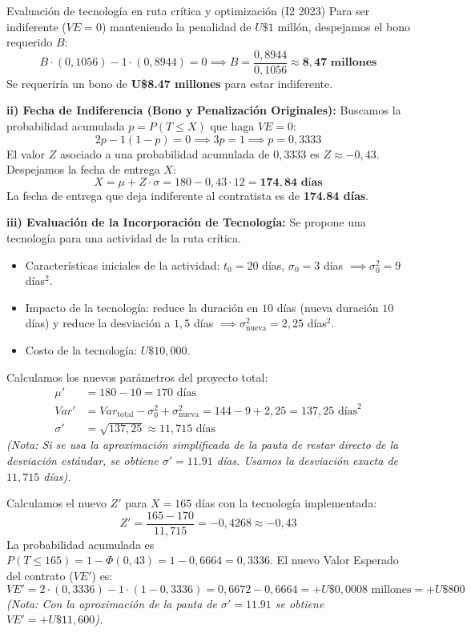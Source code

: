 \begin{ejercicio}{Evaluación de tecnología en ruta crítica y optimización (I2 2023)}
Para ser indiferente ($VE = 0$) manteniendo la penalidad de $U\$1$ millón, despejamos el bono requerido $B$:
\[
  B \cdot (0{,}1056) - 1 \cdot (0{,}8944) = 0 \implies B = \frac{0{,}8944}{0{,}1056} \approx \mathbf{8{,}47\text{ millones}}
\]
Se requeriría un bono de \textbf{U\$8.47 millones} para estar indiferente.

\textbf{ii) Fecha de Indiferencia (Bono y Penalización Originales):}
Buscamos la probabilidad acumulada $p = P(T \le X)$ que haga $VE = 0$:
\[
  2p - 1(1 - p) = 0 \implies 3p = 1 \implies p = 0{,}3333
\]
El valor $Z$ asociado a una probabilidad acumulada de $0{,}3333$ es $Z \approx -0{,}43$. Despejamos la fecha de entrega $X$:
\[
  X = \mu + Z \cdot \sigma = 180 - 0{,}43 \cdot 12 = \mathbf{174{,}84\text{ días}}
\]
La fecha de entrega que deja indiferente al contratista es de \textbf{174.84 días}.

\textbf{iii) Evaluación de la Incorporación de Tecnología:}
Se propone una tecnología para una actividad de la ruta crítica.
\begin{itemize}[leftmargin=1.4em, itemsep=1pt]
  \item Características iniciales de la actividad: $t_0 = 20$ días, $\sigma_0 = 3$ días $\implies \sigma_0^2 = 9$ días$^2$.
  \item Impacto de la tecnología: reduce la duración en $10$ días (nueva duración $10$ días) y reduce la desviación a $1{,}5$ días $\implies \sigma_{\text{nueva}}^2 = 2{,}25$ días$^2$.
  \item Costo de la tecnología: $U\$10{,}000$.
\end{itemize}
Calculamos los nuevos parámetros del proyecto total:
\begin{align*}
  \mu' &= 180 - 10 = 170\text{ días} \\
  Var' &= Var_{\text{total}} - \sigma_0^2 + \sigma_{\text{nueva}}^2 = 144 - 9 + 2{,}25 = 137{,}25\text{ días}^2 \\
  \sigma' &= \sqrt{137{,}25} \approx 11{,}715\text{ días}
\end{align*}
\textit{(Nota: Si se usa la aproximación simplificada de la pauta de restar directo de la desviación estándar, se obtiene $\sigma' = 11.91$ días. Usamos la desviación exacta de $11{,}715$ días).}

Calculamos el nuevo $Z'$ para $X = 165$ días con la tecnología implementada:
\[
  Z' = \frac{165 - 170}{11{,}715} = -0{,}4268 \approx -0{,}43
\]
La probabilidad acumulada es $P(T \le 165) = 1 - \Phi(0{,}43) = 1 - 0{,}6664 = 0{,}3336$.
El nuevo Valor Esperado del contrato ($VE'$) es:
\[
  VE' = 2 \cdot (0{,}3336) - 1 \cdot (1 - 0{,}3336) = 0{,}6672 - 0{,}6664 = +U\$0{,}0008\text{ millones} = +U\$800
\]
\textit{(Nota: Con la aproximación de la pauta de $\sigma' = 11.91$ se obtiene $VE' = +U\$11,600$).}


\end{ejercicio}

